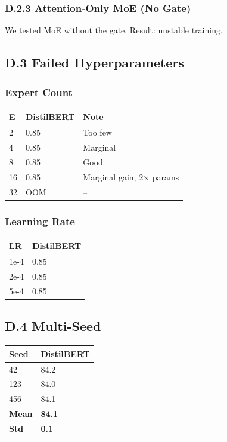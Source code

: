 \subsubsection{D.2.3 Attention-Only MoE (No Gate)}

We tested MoE without the gate. Result: unstable training.

\subsection{D.3 Failed Hyperparameters}

\subsubsection{Expert Count}

\begin{table}[H]
\centering
\small
\begin{tabular}{lll}
\toprule
\textbf{E} & \textbf{DistilBERT} & \textbf{Note} \\
\midrule
2 & 0.85 & Too few \\
4 & 0.85 & Marginal \\
8 & 0.85 & Good \\
16 & 0.85 & Marginal gain, 2$\times$ params \\
32 & OOM & -- \\
\bottomrule
\end{tabular}
\end{table}

\subsubsection{Learning Rate}

\begin{table}[H]
\centering
\small
\begin{tabular}{ll}
\toprule
\textbf{LR} & \textbf{DistilBERT} \\
\midrule
1e-4 & 0.85 \\
2e-4 & 0.85 \\
5e-4 & 0.85 \\
\bottomrule
\end{tabular}
\end{table}

\subsection{D.4 Multi-Seed}

\begin{table}[H]
\centering
\small
\begin{tabular}{ll}
\toprule
\textbf{Seed} & \textbf{DistilBERT} \\
\midrule
42 & 84.2 \\
123 & 84.0 \\
456 & 84.1 \\
\textbf{Mean} & \textbf{84.1} \\
\textbf{Std} & \textbf{0.1} \\
\bottomrule
\end{tabular}
\end{table}

